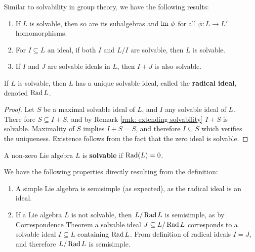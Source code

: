 \documentclass{article}
\begin{document}
\begin{remark}\label{rmk: extending solvability}
    Similar to solvability in group theory, we have the following results:
    \begin{enumerate}
        \item If $L$ is solvable, then so are its subalgebras and $\mathrm{im}\  \phi$ for all $\phi: L \to L'$ homomorphisms.
        \item For $I \subseteq L$ an ideal, if both $I$ and $L/I$ are solvable, then $L$ is solvable.
        \item If $I$ and $J$ are solvable ideals in $L$, then $I + J$ is also solvable.   
    \end{enumerate}
\end{remark}

\begin{corollary}
    If $L$ is solvable, then $L$ has a unique solvable ideal, called the \textbf{radical ideal}, denoted $\operatorname{Rad} L$.
\end{corollary}

\begin{proof}
    Let $S$ be a maximal solvable ideal of $L$, and $I$ any solvable ideal of $L$. There fore $S \subseteq I + S$, and by Remark \ref{rmk: extending solvability} $I + S$ is solvable. Maximality of $S$ implies $I + S = S$, and therefore $I \subseteq S$ which verifies the uniqueness. Existence follows from the fact that the zero ideal is solvable.
\end{proof}

\begin{definition}[Semisimple]
    A non-zero Lie algebra $L$ is \textbf{solvable} if $\operatorname{Rad}(L) = 0$.
\end{definition}

\begin{remark}
    We have the following properties directly resulting from the definition:
    \begin{enumerate}
        \item A simple Lie algebra is semisimple (as expected), as the radical ideal is an ideal.
        \item If a Lie algebra $L$ is not solvable, then $L/\operatorname{Rad} L$ is semisimple, as by Correspondence Theorem a solvable ideal $J \subseteq L/\operatorname{Rad} L$ corresponds to a solvable ideal $I \subseteq L$ containing $\operatorname{Rad} L$. From definition of radical ideals $I = J$, and therefore $L/\operatorname{Rad} L$ is semisimple.
    \end{enumerate}
\end{remark}
\end{document}
